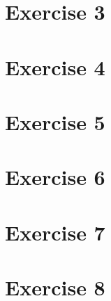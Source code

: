 \documentclass[12pt]{article}
\begin{document}
\section{Exercise 3}
\section{Exercise 4}
\section{Exercise 5}
\section{Exercise 6}
\section{Exercise 7}
\section{Exercise 8}
\end{document}
